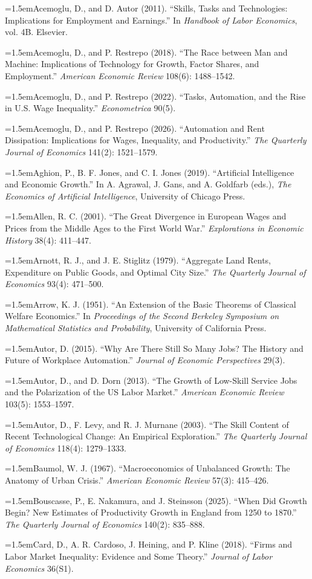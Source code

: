 \documentclass[12pt]{article}
\theoremstyle{plain}
\newcommand{\refentry}[1]{\par\hangindent=1.5em\hangafter=1\noindent #1}
\begin{document}
{\small\singlespacing
\refentry{Acemoglu, D., and D. Autor (2011). ``Skills, Tasks and Technologies: Implications for Employment and Earnings.'' In \emph{Handbook of Labor Economics}, vol. 4B. Elsevier.}
\refentry{Acemoglu, D., and P. Restrepo (2018). ``The Race between Man and Machine: Implications of Technology for Growth, Factor Shares, and Employment.'' \emph{American Economic Review} 108(6): 1488--1542.}
\refentry{Acemoglu, D., and P. Restrepo (2022). ``Tasks, Automation, and the Rise in U.S. Wage Inequality.'' \emph{Econometrica} 90(5).}
\refentry{Acemoglu, D., and P. Restrepo (2026). ``Automation and Rent Dissipation: Implications for Wages, Inequality, and Productivity.'' \emph{The Quarterly Journal of Economics} 141(2): 1521--1579.}
\refentry{Aghion, P., B. F. Jones, and C. I. Jones (2019). ``Artificial Intelligence and Economic Growth.'' In A. Agrawal, J. Gans, and A. Goldfarb (eds.), \emph{The Economics of Artificial Intelligence}, University of Chicago Press.}
\refentry{Allen, R. C. (2001). ``The Great Divergence in European Wages and Prices from the Middle Ages to the First World War.'' \emph{Explorations in Economic History} 38(4): 411--447.}
\refentry{Arnott, R. J., and J. E. Stiglitz (1979). ``Aggregate Land Rents, Expenditure on Public Goods, and Optimal City Size.'' \emph{The Quarterly Journal of Economics} 93(4): 471--500.}
\refentry{Arrow, K. J. (1951). ``An Extension of the Basic Theorems of Classical Welfare Economics.'' In \emph{Proceedings of the Second Berkeley Symposium on Mathematical Statistics and Probability}, University of California Press.}
\refentry{Autor, D. (2015). ``Why Are There Still So Many Jobs? The History and Future of Workplace Automation.'' \emph{Journal of Economic Perspectives} 29(3).}
\refentry{Autor, D., and D. Dorn (2013). ``The Growth of Low-Skill Service Jobs and the Polarization of the US Labor Market.'' \emph{American Economic Review} 103(5): 1553--1597.}
\refentry{Autor, D., F. Levy, and R. J. Murnane (2003). ``The Skill Content of Recent Technological Change: An Empirical Exploration.'' \emph{The Quarterly Journal of Economics} 118(4): 1279--1333.}
\refentry{Baumol, W. J. (1967). ``Macroeconomics of Unbalanced Growth: The Anatomy of Urban Crisis.'' \emph{American Economic Review} 57(3): 415--426.}
\refentry{Bouscasse, P., E. Nakamura, and J. Steinsson (2025). ``When Did Growth Begin? New Estimates of Productivity Growth in England from 1250 to 1870.'' \emph{The Quarterly Journal of Economics} 140(2): 835--888.}
\refentry{Card, D., A. R. Cardoso, J. Heining, and P. Kline (2018). ``Firms and Labor Market Inequality: Evidence and Some Theory.'' \emph{Journal of Labor Economics} 36(S1).}
}
\end{document}
